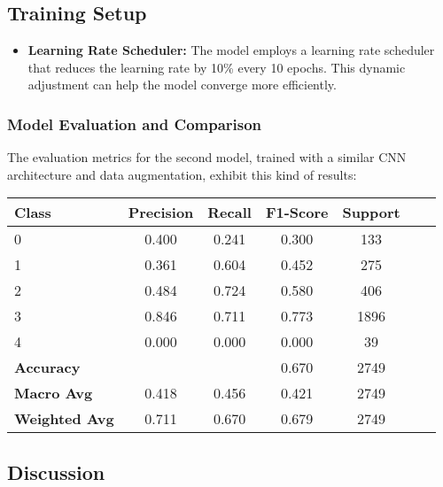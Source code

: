 \documentclass{article}
\begin{document}
\subsection{Training Setup}

\begin{itemize}
    \item \textbf{Learning Rate Scheduler:} The model employs a learning rate scheduler that reduces the learning rate by 10\% every 10 epochs. This dynamic adjustment can help the model converge more efficiently.
\end{itemize}

\subsubsection{Model Evaluation and Comparison}

The evaluation metrics for the second model, trained with a similar CNN architecture and data augmentation, exhibit this kind of results:

\begin{center}
    \centering
    \begin{tabular}{lcccccc}
        \hline
        \textbf{Class} & \textbf{Precision} & \textbf{Recall} & \textbf{F1-Score} & \textbf{Support} \\
        \hline
        0 & 0.400 & 0.241 & 0.300 & 133 \\
        1 & 0.361 & 0.604 & 0.452 & 275 \\
        2 & 0.484 & 0.724 & 0.580 & 406 \\
        3 & 0.846 & 0.711 & 0.773 & 1896 \\
        4 & 0.000 & 0.000 & 0.000 & 39 \\
        \hline
        \textbf{Accuracy} & & & 0.670 & 2749 \\
        \textbf{Macro Avg} & 0.418 & 0.456 & 0.421 & 2749 \\
        \textbf{Weighted Avg} & 0.711 & 0.670 & 0.679 & 2749 \\
        \hline
    \end{tabular}
\end{center}

\newpage

\subsection{Discussion}
\end{document}
